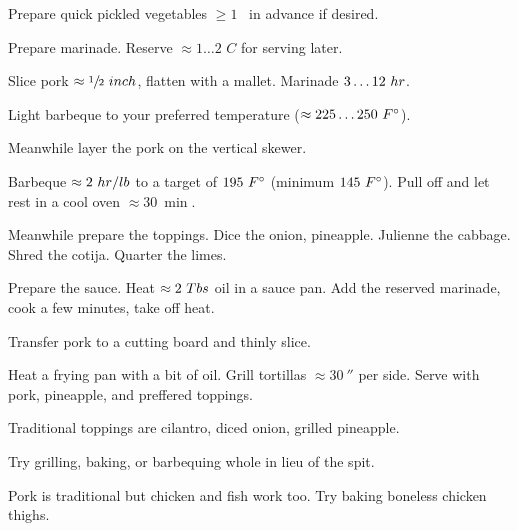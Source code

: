 \begin{preparation}
\item Prepare quick pickled vegetables $\ge 1$ \week~in advance if desired.

\item Prepare marinade.
    Reserve $\approx 1 \dots 2$ $C$ for serving later.

\item Slice pork $\approx \onehalf~\inch$, flatten with a mallet.
    Marinade $3 \dots 12~\hour$.

\item Light barbeque to your preferred temperature ($\approx 225 \dots
    250~\Fahrenheit$).

\item Meanwhile layer the pork on the vertical skewer.

\item Barbeque $\approx 2~\hour / \pound$ to a target of $195~\Fahrenheit$
    (minimum $145~\Fahrenheit$).
    Pull off and let rest in a cool oven $\approx 30~\min$.

\item Meanwhile prepare the toppings.
    Dice the onion, pineapple.
    Julienne the cabbage.
    Shred the cotija.
    Quarter the limes.

\item Prepare the sauce.
    Heat $\approx 2~\Tablespoon$ oil in a sauce pan.
    Add the reserved marinade, cook a few minutes, take off heat.

\item Transfer pork to a cutting board and thinly slice.

\item Heat a frying pan with a bit of oil.
    Grill tortillas $\approx 30~\second$ per side.
    Serve with pork, pineapple, and preffered toppings.
\end{preparation}

\begin{variation}
\item Traditional toppings are cilantro, diced onion, grilled pineapple.

\item Try grilling, baking, or barbequing whole in lieu of the spit.

\item Pork is traditional but chicken and fish work too.
    Try baking boneless chicken thighs.
\end{variation}

\recipeend%
